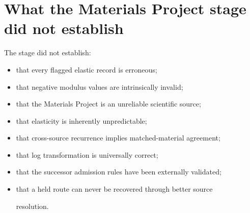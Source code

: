 \documentclass[11pt,a4paper,oneside]{report}
\begin{document}
\section{What the Materials Project stage did not establish}



The stage did not establish:



\begin{itemize}



\item

that every flagged elastic record is erroneous;



\item

that negative modulus values are intrinsically invalid;



\item

that the Materials Project is an unreliable scientific source;



\item

that elasticity is inherently unpredictable;



\item

that cross-source recurrence implies matched-material agreement;



\item

that log transformation is universally correct;



\item

that the successor admission rules have been externally validated;



\item

that a held route can never be recovered through better source

resolution.



\end{itemize}
\end{document}
